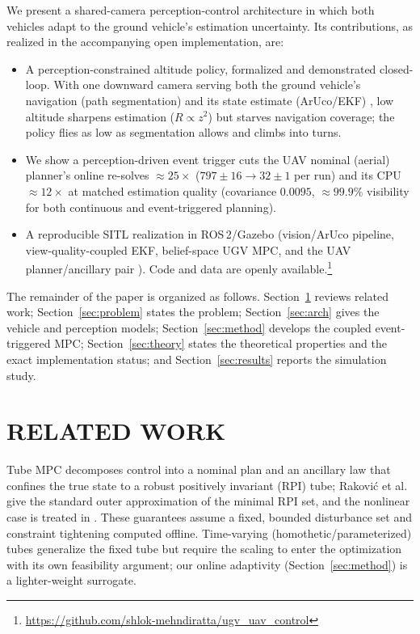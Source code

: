 \documentclass[letterpaper, 10 pt, conference]{ieeeconf}  %
\newcommand{\RESsolvesCone}{\ensuremath{797\pm16}}\newcommand{\RESsolvesCthree}{\ensuremath{32\pm1}}
\newcommand{\REScov}{\ensuremath{0.0095}}\newcommand{\RESsolveRed}{25}\newcommand{\REScpuRed}{12}
\begin{document}
We present a shared-camera perception-control architecture in
which {both} vehicles adapt to the ground vehicle's estimation uncertainty.
Its contributions, as realized in the accompanying open implementation, are:

\begin{itemize}
\item  {A perception-constrained altitude policy, formalized and demonstrated
closed-loop.} With one downward camera serving both the ground vehicle's navigation (path
segmentation) and its state estimate (ArUco/EKF) \cite{platt2010belief,vandenberg2012motion},
low altitude sharpens estimation ($R\propto z^2$) but starves navigation coverage; the policy
flies as low as segmentation allows and climbs into turns. 

\item  We show a perception-driven event trigger cuts the UAV nominal (aerial) planner's online re-solves $\approx\!\RESsolveRed\times$ ($\RESsolvesCone\!\to\!\RESsolvesCthree$ per run) and its CPU $\approx\!\REScpuRed\times$ at matched estimation quality (covariance $\REScov$, $\approx\!99.9\%$ visibility for both continuous and event-triggered planning).

\item  {A reproducible SITL realization} in ROS\,2/Gazebo
(vision/ArUco pipeline, view-quality-coupled EKF, belief-space UGV MPC, and the UAV
planner/ancillary pair \cite{mayne2005robust,eqtami2010event}). Code and data are openly
available.\footnote{\url{https://github.com/shlok-mehndiratta/ugv_uav_control}}
\end{itemize}
The remainder of the paper is organized as follows. Section~\ref{sec:related} reviews related
work; Section~\ref{sec:problem} states the problem; Section~\ref{sec:arch} gives
the vehicle and perception models; Section~\ref{sec:method} develops the coupled
event-triggered MPC; Section~\ref{sec:theory} states the theoretical
properties and the exact implementation status; and Section~\ref{sec:results}
reports the simulation study.

\section{RELATED WORK}
\label{sec:related}

 Tube MPC \cite{mayne2005robust,langson2004tubes,chisci2001persistent}
decomposes control into a nominal plan and an ancillary law that confines the true state to a
robust positively invariant (RPI) tube; Rakovi\'c et al. \cite{mRPI} give the standard
outer approximation of the minimal RPI set, and the nonlinear case is treated in
\cite{mayne2011tube}. These guarantees assume a fixed, bounded disturbance set and constraint
tightening computed offline. Time-varying (homothetic/parameterized) tubes generalize the
fixed tube but require the scaling to enter the optimization with its own feasibility argument;
our online adaptivity (Section~\ref{sec:method}) is a lighter-weight surrogate.
\end{document}
